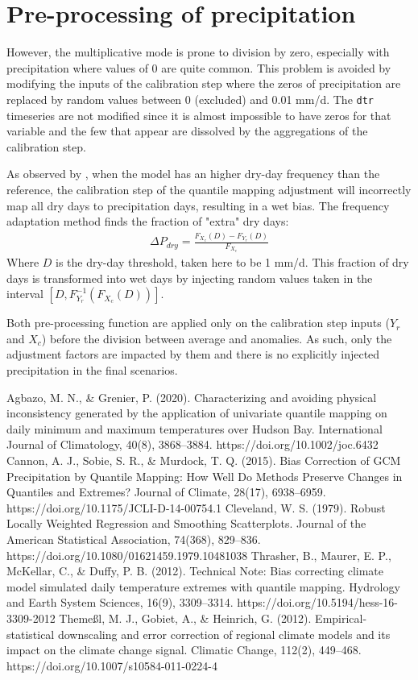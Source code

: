 \documentclass[letterpaper,10pt]{article}
\begin{document}
\section{Pre-processing of precipitation}
However, the multiplicative mode is prone to division by zero, especially with precipitation where values of 0 are quite common.
This problem is avoided by modifying the inputs of the calibration step where the zeros of precipitation are replaced by random values between 0 (excluded) and 0.01 mm/d.
The \texttt{dtr} timeseries are not modified since it is almost impossible to have zeros for that variable and the few that appear are dissolved by the aggregations of the calibration step.

As observed by \cite{Themessl12}, when the model has an higher dry-day frequency than the reference, the calibration step of the quantile mapping adjustment will incorrectly map all dry days to precipitation days, resulting in a wet bias.
The frequency adaptation method finds the fraction of "extra" dry days:
\begin{align}
\Delta P_{dry} = \frac{F_{X_c}(D) - F_{Y_r}(D)}{F_{X_c}}
\end{align}
Where $D$ is the dry-day threshold, taken here to be 1 mm/d.
This fraction of dry days is transformed into wet days by injecting random values taken in the interval $[D, F^{-1}_{Y_r}\left(F_{X_c}(D)\right)]$.

Both pre-processing function are applied only on the calibration step inputs ($Y_r$ and $X_c$) before the division between average and anomalies.
As such, only the adjustment factors are impacted by them and there is no explicitly injected precipitation in the final scenarios.

\begin{thebibliography}{6}
 Agbazo, M. N., \& Grenier, P. (2020). Characterizing and avoiding physical inconsistency generated by the application of univariate quantile mapping on daily minimum and maximum temperatures over Hudson Bay. International Journal of Climatology, 40(8), 3868–3884. https://doi.org/10.1002/joc.6432
 Cannon, A. J., Sobie, S. R., \& Murdock, T. Q. (2015). Bias Correction of GCM Precipitation by Quantile Mapping: How Well Do Methods Preserve Changes in Quantiles and Extremes? Journal of Climate, 28(17), 6938–6959. https://doi.org/10.1175/JCLI-D-14-00754.1
 Cleveland, W. S. (1979). Robust Locally Weighted Regression and Smoothing Scatterplots. Journal of the American Statistical Association, 74(368), 829–836. https://doi.org/10.1080/01621459.1979.10481038
 Thrasher, B., Maurer, E. P., McKellar, C., \& Duffy, P. B. (2012). Technical Note: Bias correcting climate model simulated daily temperature extremes with quantile mapping. Hydrology and Earth System Sciences, 16(9), 3309–3314. https://doi.org/10.5194/hess-16-3309-2012
 Themeßl, M. J., Gobiet, A., \& Heinrich, G. (2012). Empirical-statistical downscaling and error correction of regional climate models and its impact on the climate change signal. Climatic Change, 112(2), 449–468. https://doi.org/10.1007/s10584-011-0224-4
\end{thebibliography}
\end{document}
